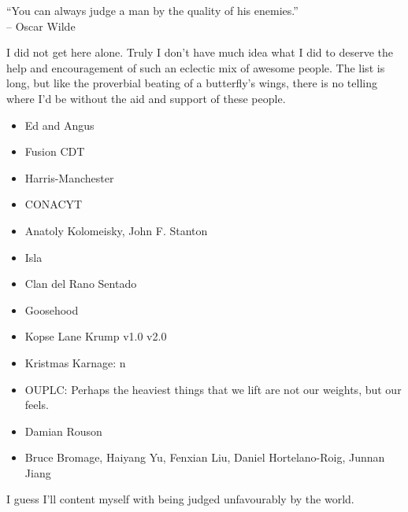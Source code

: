 \begin{frontmatter}[Acknowledgements]
    \centering
    ``You can always judge a man by the quality of his enemies.''\\
    -- Oscar Wilde

    \justify
    I did not get here alone. Truly I don't have much idea what I did to deserve the help and encouragement of such an eclectic mix of awesome people. The list is long, but like the proverbial beating of a butterfly's wings, there is no telling where I'd be without the aid and support of these people.

    \begin{itemize}
        \item Ed and Angus
        \item Fusion CDT
        \item Harris-Manchester
        \item CONACYT
        \item Anatoly Kolomeisky, John F. Stanton
        \item Isla
        \item Clan del Rano Sentado
        \item Goosehood
        \item Kopse Lane Krump v1.0 v2.0
        \item Kristmas Karnage: n
        \item OUPLC: Perhaps the heaviest things that we lift are not our weights, but our feels.
        \item Damian Rouson
        \item Bruce Bromage, Haiyang Yu, Fenxian Liu, Daniel Hortelano-Roig, Junnan Jiang
    \end{itemize}

    I guess I'll content myself with being judged unfavourably by the world.
\end{frontmatter}